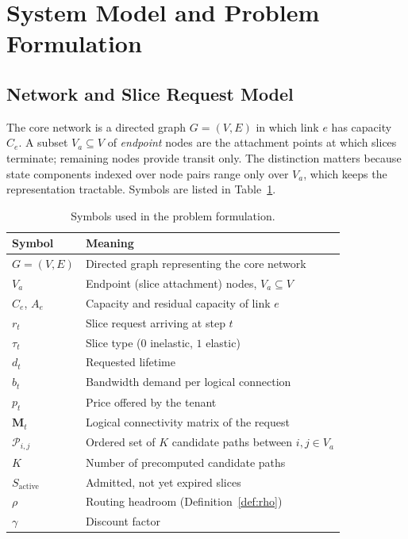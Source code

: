 \documentclass[10pt,journal,comsoc]{IEEEtran}
\begin{document}
\section{System Model and Problem Formulation} \label{model}

\subsection{Network and Slice Request Model}
The core network is a directed graph $G=(V,E)$ in which link $e$ has
capacity $C_e$. A subset $V_a \subseteq V$ of \emph{endpoint} nodes are
the attachment points at which slices terminate; remaining nodes provide
transit only. The distinction matters because state components indexed
over node pairs range only over $V_a$, which keeps the representation
tractable. Symbols are listed in Table~\ref{tab:problem_symbols}.

\begin{table}[t]
\centering
\caption{Symbols used in the problem formulation.}
\label{tab:problem_symbols}
\renewcommand{\arraystretch}{1.15}
\begin{tabular}{>{\raggedright\arraybackslash}p{1.3cm} >{\raggedright\arraybackslash}p{6.6cm}}
\toprule
\textbf{Symbol} & \textbf{Meaning} \\
\midrule
$G=(V,E)$ & Directed graph representing the core network \\
$V_a$ & Endpoint (slice attachment) nodes, $V_a \subseteq V$ \\
$C_e$, $A_e$ & Capacity and residual capacity of link $e$ \\
$r_t$ & Slice request arriving at step $t$ \\
$\tau_t$ & Slice type ($0$ inelastic, $1$ elastic) \\
$d_t$ & Requested lifetime \\
$b_t$ & Bandwidth demand per logical connection \\
$p_t$ & Price offered by the tenant \\
$\mathbf{M}_t$ & Logical connectivity matrix of the request \\
$\mathcal{P}_{i,j}$ & Ordered set of $K$ candidate paths between $i,j \in V_a$ \\
$K$ & Number of precomputed candidate paths \\
$S_{\text{active}}$ & Admitted, not yet expired slices \\
$\rho$ & Routing headroom (Definition~\ref{def:rho}) \\
$\gamma$ & Discount factor \\
\bottomrule
\end{tabular}
\end{table}
\end{document}
